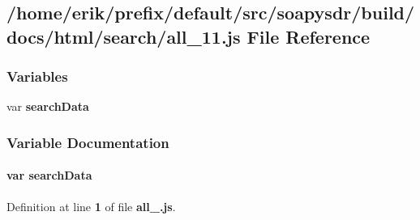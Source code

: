 \subsection{/home/erik/prefix/default/src/soapysdr/build/docs/html/search/all\+\_\+11.js File Reference}
\label{all__11_8js}
\subsubsection*{Variables}
\begin{DoxyCompactItemize}
\item 
var {\bf search\+Data}
\end{DoxyCompactItemize}


\subsubsection{Variable Documentation}
\paragraph[{search\+Data}]{\setlength{\rightskip}{0pt plus 5cm}var search\+Data}\label{all__11_8js_ad01a7523f103d6242ef9b0451861231e}


Definition at line {\bf 1} of file {\bf all\+\_.\+js}.

